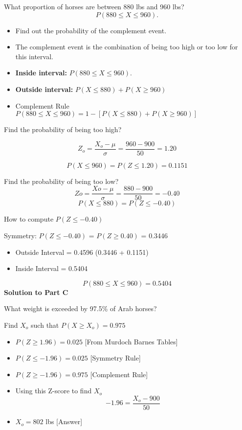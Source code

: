 \documentclass[a4paper,12pt]{article}
\begin{document}
\noindent What proportion of horses are between 880 lbs and 960 lbs?
\[P ( 880 \leq X \leq 960).\]
\begin{itemize}
	\item Find out the probability of the complement event.
	\item The complement event is the combination of being too high  or too low for this interval.
	
	\item \textbf{Inside interval:} $P ( 880 \leq X \leq 960).$
	
	\item \textbf{Outside interval:} $P (X \leq 880) + P(X \geq 960)$
	
	\item Complement Rule $P ( 880\leq X \leq 960)  = 1 - [P (X\leq 880) +P(X\geq 960)]$
	
\end{itemize}

\noindent  Find the probability of being too high?

\[Z_o=\frac{X_o-\mu}{\sigma}= \frac{960 -900}{50}= 1.20\]

\[P(X \leq 960) = P(Z \leq 1.20) = 0.1151\]


\noindent Find the probability of being too low?
\[Zo= \frac{Xo-\mu}{\sigma}= \frac{880 -900}{50}= -0.40 \]
\[P(X \leq 880) = P(Z \leq -0.40)  \]

\noindent How to compute $P(Z \leq -0.40)$

\noindent Symmetry: 	$P(Z \leq -0.40)$ = $P(Z \geq 0.40)$ = 0.3446


\begin{itemize}
	\item Outside Interval = 0.4596        (0.3446 +  0.1151)
	\item Inside Interval = 0.5404
\end{itemize}


\[P ( 880 \leq X \leq 960)=0.5404 \]
\noindent \textbf{Solution to Part C}

\noindent What weight is exceeded by 97.5\% of Arab horses? 

\noindent Find $X_o$  such that $P(X\geq X_o) = 0.975$

\begin{itemize}
	\item 	$P(Z \geq 1.96) = 0.025$ [From Murdoch Barnes Tables] 
	
	\item	$P(Z \leq -1.96) = 0.025$ [Symmetry Rule]
	
	\item	$P(Z \geq -1.96) = 0.975$ [Complement Rule]     
	
	\item	Using this Z-score to find $X_o$
	\[-1.96 = \frac{X_o- 900}{50} \]
	
	
	\item	$X_o= 802$ lbs  [Answer]
\end{itemize}	
\end{document}
